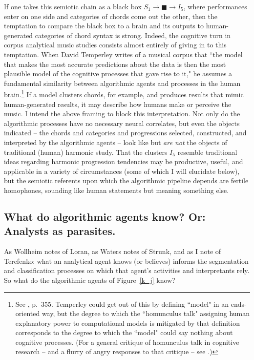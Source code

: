If one takes this semiotic chain as a black box $S_1 \rightarrow \blacksquare \rightarrow I_5$, where performances enter on one side and categories of chords come out the other, then the temptation to compare the black box to a brain and its outputs to human-generated categories of chord syntax is strong.  Indeed, the cognitive turn in corpus analytical music studies consists almost entirely of giving in to this temptation.  When David Temperley writes of a musical corpus that ``the model that makes the most accurate predictions about the data is then the most plausible model of the cognitive processes that gave rise to it," he assumes a fundamental similarity between algorithmic agents and processes in the human brain.\footnote{See \cite{temperley2010}, p.\ 355.  Temperley could get out of this by defining ``model" in an ends-oriented way, but the degree to which the ``homunculus talk" assigning human explanatory power to computational models is mitigated by that definition corresponds to the degree to which the ``model" could say nothing about cognitive processes.  (For a general critique of homunculus talk in cognitive research -- and a flurry of angry responses to that critique -- see \cite{mcginn2013}.)}  If a model clusters chords, for example, and produces results that mimic human-generated results, it may describe how humans make or perceive the music.  I intend the above framing to block this interpretation.  Not only do the algorithmic processes have no necessary neural correlates, but even the objects indicated -- the chords and categories and progressions selected, constructed, and interpreted by the algorithmic agents -- look like but \emph{are not} the objects of traditional (human) harmonic study.  That the clusters $I_5$ resemble traditional ideas regarding harmonic progression tendencies may be productive, useful, and applicable in a variety of circumstances (some of which I will elucidate below), but the semiotic referents upon which the algorithmic pipeline depends are fertile homophones, sounding like human statements but meaning something else.

\subsection{What do algorithmic agents know?  Or: Analysts as parasites.}
As Wollheim notes of Loran, as Waters notes of Strunk, and as I note of Terefenko: what an analytical agent knows (or believes) informs the segmentation and classification processes on which that agent's activities and interpretants rely.  So what do the algorithmic agents of Figure~\ref{k_j} know?

